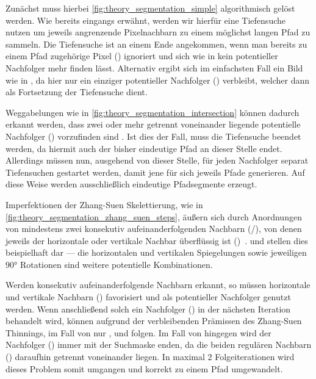 Zunächst muss hierbei \autoref{fig:theory_segmentation_simple} algorithmisch gelöst werden.
Wie bereits eingangs erwähnt, werden wir hierfür eine Tiefensuche nutzen um jeweils angrenzende Pixelnachbarn zu einem möglichst langen Pfad zu sammeln.
Die Tiefensuche ist an einem Ende angekommen, wenn man bereits zu einem Pfad zugehörige Pixel () ignoriert und sich wie in  kein potentieller Nachfolger mehr finden lässt.
Alternativ ergibt sich im einfachsten Fall ein Bild wie in , da hier nur ein einziger potentieller Nachfolger (\textcolor{gray}{}) verbleibt, welcher dann als Fortsetzung der Tiefensuche dient.

Weggabelungen wie in \autoref{fig:theory_segmentation_intersection} können dadurch erkannt werden, dass zwei oder mehr getrennt voneinander liegende potentielle Nachfolger (\textcolor{gray}{}) vorzufinden sind .
Ist dies der Fall, muss die Tiefensuche beendet werden, da hiermit auch der bisher eindeutige Pfad an dieser Stelle endet.
Allerdings müssen nun, ausgehend von dieser Stelle, für jeden Nachfolger separat Tiefensuchen gestartet werden, damit jene für sich jeweils Pfade generieren.
Auf diese Weise werden ausschließlich eindeutige Pfadsegmente erzeugt.

Imperfektionen der Zhang-Suen Skelettierung, wie in \autoref{fig:theory_segmentation_zhang_suen_steps}, äußern sich durch Anordnungen von mindestens zwei konsekutiv aufeinanderfolgenden Nachbarn (\textcolor{gray}{}/\textcolor{gray}{}), von denen jeweils der horizontale oder vertikale Nachbar überflüssig ist (\textcolor{gray}{})~\cite{DBLP:journals/pami/LamLS92}.
 und  stellen dies beispielhaft dar --- die horizontalen und vertikalen Spiegelungen sowie jeweiligen \(90°\) Rotationen sind weitere potentielle Kombinationen.

Werden konsekutiv aufeinanderfolgende Nachbarn erkannt, so müssen horizontale und vertikale Nachbarn (\textcolor{gray}{}) favorisiert und als potentieller Nachfolger genutzt werden.
Wenn anschließend solch ein Nachfolger (\textcolor{gray}{}) in der nächsten Iteration behandelt wird, können aufgrund der verbleibenden Prämissen des Zhang-Suen Thinnings, im Fall von  nur ,  und  folgen.
Im Fall von  hingegen wird der Nachfolger (\textcolor{gray}{}) immer mit der Suchmaske  enden, da die beiden regulären Nachbarn (\textcolor{gray}{}) daraufhin getrennt voneinander liegen.
In maximal 2 Folgeiterationen wird dieses Problem somit umgangen und korrekt zu einem Pfad umgewandelt.

